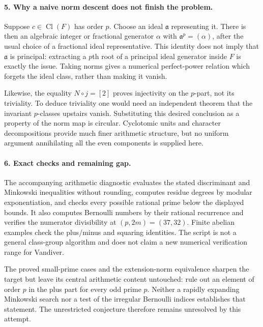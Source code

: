 \documentclass[11pt]{article}
\begin{document}
\paragraph{5. Why a naive norm descent does not finish the problem.}
Suppose $c\in\operatorname{Cl}(F)$ has order $p$. Choose an ideal $\mathfrak a$ representing it. There is then an algebraic integer or fractional generator $\alpha$ with $\mathfrak a^p=(\alpha)$, after the usual choice of a fractional ideal representative. This identity does not imply that $\mathfrak a$ is principal: extracting a $p$th root of a principal ideal generator inside $F$ is exactly the issue. Taking norms gives a numerical perfect-power relation which forgets the ideal class, rather than making it vanish.

Likewise, the equality $N\circ j=[2]$ proves injectivity on the $p$-part, not its triviality. To deduce triviality one would need an independent theorem that the invariant $p$-classes upstairs vanish. Substituting this desired conclusion as a property of the norm map is circular. Cyclotomic units and character decompositions provide much finer arithmetic structure, but no uniform argument annihilating all the even components is supplied here.

\paragraph{6. Exact checks and remaining gap.}
The accompanying arithmetic diagnostic evaluates the stated discriminant and Minkowski inequalities without rounding, computes residue degrees by modular exponentiation, and checks every possible rational prime below the displayed bounds. It also computes Bernoulli numbers by their rational recurrence and verifies the numerator divisibility at $(p,2m)=(37,32)$. Finite abelian examples check the plus/minus and squaring identities. The script is not a general class-group algorithm and does not claim a new numerical verification range for Vandiver.

The proved small-prime cases and the extension-norm equivalence sharpen the target but leave its central arithmetic content untouched: rule out an element of order $p$ in the plus part for every odd prime $p$. Neither a rapidly expanding Minkowski search nor a test of the irregular Bernoulli indices establishes that statement. The unrestricted conjecture therefore remains unresolved by this attempt.
\end{document}

